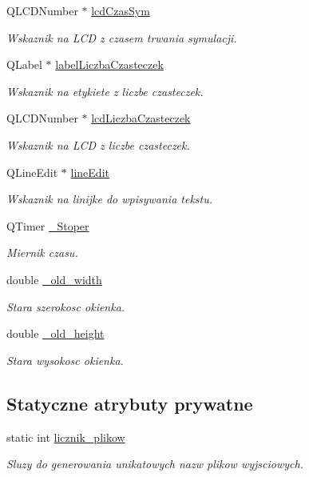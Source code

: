 \begin{DoxyCompactItemize}
Q\+L\+C\+D\+Number $\ast$ \hyperlink{class_okno_glowne_ab34fefe738e38b1b0d4ce764481cc0c6}{lcd\+Czas\+Sym}
\begin{DoxyCompactList}\small\item\em Wskaznik na L\+C\+D z czasem trwania symulacji. \end{DoxyCompactList}\item 
Q\+Label $\ast$ \hyperlink{class_okno_glowne_ab01460f1222d0ec2892abf21efb23078}{label\+Liczba\+Czasteczek}
\begin{DoxyCompactList}\small\item\em Wskaznik na etykiete z liczbe czasteczek. \end{DoxyCompactList}\item 
Q\+L\+C\+D\+Number $\ast$ \hyperlink{class_okno_glowne_adbdd9fc009725804e015d267dc8375dc}{lcd\+Liczba\+Czasteczek}
\begin{DoxyCompactList}\small\item\em Wskaznik na L\+C\+D z liczbe czasteczek. \end{DoxyCompactList}\item 
Q\+Line\+Edit $\ast$ \hyperlink{class_okno_glowne_a0112b8be70a26552b03f38fab43a3301}{line\+Edit}
\begin{DoxyCompactList}\small\item\em Wskaznik na linijke do wpisywania tekstu. \end{DoxyCompactList}\item 
Q\+Timer \hyperlink{class_okno_glowne_a5d047f90666212f58e69d11af3285d9b}{\+\_\+\+Stoper}
\begin{DoxyCompactList}\small\item\em Miernik czasu. \end{DoxyCompactList}\item 
double \hyperlink{class_okno_glowne_a6a0922607c0970ecdfe8adec7a773c7f}{\+\_\+old\+\_\+width}
\begin{DoxyCompactList}\small\item\em Stara szerokosc okienka. \end{DoxyCompactList}\item 
double \hyperlink{class_okno_glowne_a7dae1b25dbade179eb6dfc30ffeab14b}{\+\_\+old\+\_\+height}
\begin{DoxyCompactList}\small\item\em Stara wysokosc okienka. \end{DoxyCompactList}\end{DoxyCompactItemize}
\subsection*{Statyczne atrybuty prywatne}
\begin{DoxyCompactItemize}
\item 
static int \hyperlink{class_okno_glowne_ae615cbd9c9f9ab06b365c4692ff68729}{licznik\+\_\+plikow}
\begin{DoxyCompactList}\small\item\em Sluzy do generowania unikatowych nazw plikow wyjsciowych. \end{DoxyCompactList}\end{DoxyCompactItemize}


